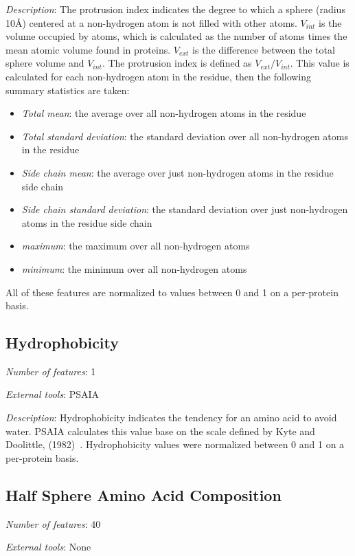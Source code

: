 \noindent
\emph{Description}:
The protrusion index indicates the degree to which a sphere (radius 10\AA{}) centered at a non-hydrogen atom is not filled with other atoms.
$V_{int}$ is the volume occupied by atoms, which is calculated as the number of atoms times the mean atomic volume found in proteins.
$V_{ext}$ is the difference between the total sphere volume and $V_{int}$. 
The protrusion index is defined as $V_{ext}/V_{int}$.
This value is calculated for each non-hydrogen atom in the residue, then the following summary statistics are taken:
\begin{itemize}
	\item \emph{Total mean}: the average over all non-hydrogen atoms in the residue
	\item \emph{Total standard deviation}: the standard deviation over all non-hydrogen atoms in the residue
	\item \emph{Side chain mean}: the average over just non-hydrogen atoms in the residue side chain
	\item \emph{Side chain standard deviation}: the standard deviation over just non-hydrogen atoms in the residue side chain
	\item \emph{maximum}: the maximum over all non-hydrogen atoms
	\item \emph{minimum}: the minimum over all non-hydrogen atoms
\end{itemize}
All of these features are normalized to values between 0 and 1 on a per-protein basis.


\subsection{Hydrophobicity}
\noindent
\emph{Number of features}: 1

\noindent
\emph{External tools}: PSAIA~\cite{mihel2008}

\noindent
\emph{Description}:
Hydrophobicity indicates the tendency for an amino acid to avoid water.
PSAIA calculates this value base on the scale defined by Kyte and Doolittle, (1982)~\cite{kyte1982}.
Hydrophobicity values were normalized between 0 and 1 on a per-protein basis.


\subsection{Half Sphere Amino Acid Composition}
\noindent
\emph{Number of features}: 40

\noindent
\emph{External tools}:  None

